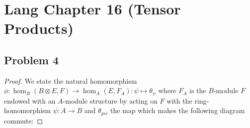 \documentclass[Lang.tex]{subfiles}
\begin{document}
\section*{Lang Chapter 16 (Tensor Products)}

\subsection*{Problem 4}

	\begin{proof}
		We state the natural homomorphism $\phi:\hom_B{(B \otimes E,F)} \rightarrow \hom_A{(E, F_A)}: \psi \mapsto \theta_{\psi}$ where $F_A$ is the $B$-module $F$ endowed with an $A$-module structure by acting on $F$ with the ring-homomorphism $\psi: A \rightarrow B$ and $\theta_{psi}$ the map which makes the following diagram commute:
		
	\end{proof}
\end{document}
